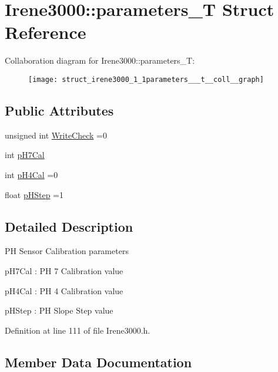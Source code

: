 \hypertarget{struct_irene3000_1_1parameters___t}{}\section{Irene3000\+:\+:parameters\+\_\+T Struct Reference}
\label{struct_irene3000_1_1parameters___t}


Collaboration diagram for Irene3000\+:\+:parameters\+\_\+T\+:\nopagebreak
\begin{figure}[H]
\begin{center}
\leavevmode
\texttt{[image: struct\_irene3000\_1\_1parameters\_\_\_t\_\_coll\_\_graph]}
\end{center}
\end{figure}
\subsection*{Public Attributes}
\begin{DoxyCompactItemize}
\item 
unsigned int \hyperlink{struct_irene3000_1_1parameters___t_a56f1f14d33a69300d580eda2dc52cecd}{Write\+Check} =0
\item 
int \hyperlink{struct_irene3000_1_1parameters___t_a21265466a570d84bff914f26d2f7a03e}{p\+H7\+Cal}
\item 
int \hyperlink{struct_irene3000_1_1parameters___t_a1144de6fb54eb3e1dd2a3d8c2afc97dc}{p\+H4\+Cal} =0
\item 
float \hyperlink{struct_irene3000_1_1parameters___t_a61cfcc2539d5f630e9071f3753aba9fe}{p\+H\+Step} =1
\end{DoxyCompactItemize}


\subsection{Detailed Description}
PH Sensor Calibration parameters

p\+H7\+Cal \+: PH 7 Calibration value

p\+H4\+Cal \+: PH 4 Calibration value

p\+H\+Step \+: PH Slope Step value 

Definition at line 111 of file Irene3000.\+h.



\subsection{Member Data Documentation}
\mbox{\label{struct_irene3000_1_1parameters___t_a1144de6fb54eb3e1dd2a3d8c2afc97dc}} 
